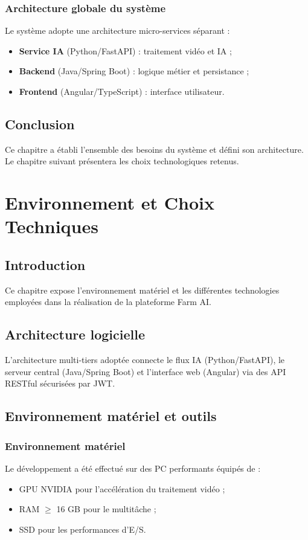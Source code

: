 \documentclass[12pt,a4paper]{report}
\numberwithin{figure}{chapter}
\numberwithin{table}{chapter}
\begin{document}
\subsection{Architecture globale du système}
Le système adopte une architecture micro-services séparant :
\begin{itemize}
  \item \textbf{Service IA} (Python/FastAPI) : traitement vidéo et IA ;
  \item \textbf{Backend} (Java/Spring Boot) : logique métier et persistance ;
  \item \textbf{Frontend} (Angular/TypeScript) : interface utilisateur.
\end{itemize}

\section{Conclusion}
Ce chapitre a établi l'ensemble des besoins du système et défini son architecture. Le chapitre
suivant présentera les choix technologiques retenus.

\chapter{Environnement et Choix Techniques}

\section{Introduction}
Ce chapitre expose l'environnement matériel et les différentes technologies employées dans la
réalisation de la plateforme Farm AI.

\section{Architecture logicielle}
L'architecture multi-tiers adoptée connecte le flux IA (Python/FastAPI), le serveur central
(Java/Spring Boot) et l'interface web (Angular) via des API RESTful sécurisées par JWT.

\section{Environnement matériel et outils}

\subsection{Environnement matériel}
Le développement a été effectué sur des PC performants équipés de :
\begin{itemize}
  \item GPU NVIDIA pour l'accélération du traitement vidéo ;
  \item RAM $\geq$ 16 GB pour le multitâche ;
  \item SSD pour les performances d'E/S.
\end{itemize}
\end{document}
